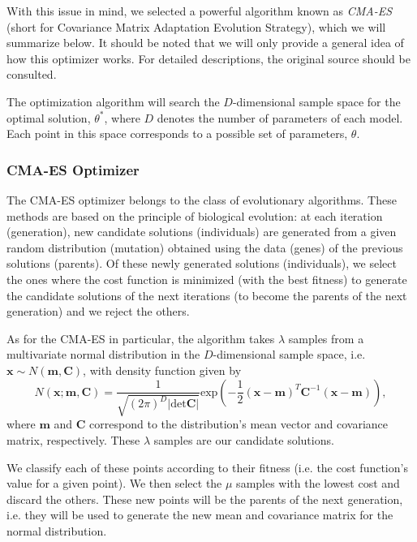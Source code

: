 With this issue in mind, we selected a powerful algorithm known as \emph{CMA-ES}~\citep{Hansen2} (short for Covariance Matrix Adaptation Evolution Strategy), which we will summarize below. It should be noted that we will only provide a general idea of how this optimizer works. For detailed descriptions, the original source should be consulted.

The optimization algorithm will search the $D$-dimensional sample space for the optimal solution, $\theta^{*}$, where $D$ denotes the number of parameters of each model. Each point in this space corresponds to a possible set of parameters, $\theta$.




\subsubsection{CMA-ES Optimizer}
The CMA-ES optimizer belongs to the class of evolutionary algorithms. These methods are based on the principle of biological evolution: at each iteration (generation), new candidate solutions (individuals) are generated from a given random distribution (mutation) obtained using the data (genes) of the previous solutions (parents). Of these newly generated solutions (individuals), we select the ones where the cost function is minimized (with the best fitness) to generate the candidate solutions of the next iterations (to become the parents of the next generation) and we reject the others.



As for the CMA-ES in particular, the algorithm takes $\lambda$ samples from a multivariate normal distribution in the $D$-dimensional sample space, i.e. $\mathbf{x}\sim N(\mathbf{m,C})$, with density function given by
\begin{equation}
N(\mathbf{x;m,C})=\frac{1}{\sqrt{(2\pi)^D|\mathrm{det}\mathbf{C}|}}\mathrm{exp}\left(-\frac{1}{2}(\mathbf{x}-\mathbf{m})^T\mathbf{C}^{-1}(\mathbf{x}-\mathbf{m})\right),
\end{equation}
\noindent where $\mathbf{m}$ and $\mathbf{C}$ correspond to the distribution's mean vector and covariance matrix, respectively.
These $\lambda$ samples are our candidate solutions.

We classify each of these points according to their fitness (i.e. the cost function's value for a given point). We then select the $\mu$ samples with the lowest cost and discard the others. These new points will be the parents of the next generation, i.e. they will be used to generate the new mean and covariance matrix for the normal distribution.



